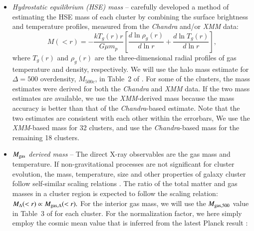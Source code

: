 \documentclass[iop, apj]{emulateapj}
\newcommand{\?}{\stackrel{?}{=}}
\begin{document}
 \begin{itemize}
  \item {\it Hydrostatic equilibrium (HSE) mass} --
	\citet{Martinoetal:14} carefully developed a method of
	estimating the HSE mass of each cluster by combining the surface
	brightness and temperature profiles, measured from the {\it Chandra}
	and/or {\it XMM} data:
\begin{equation}
 M(<r)=-\frac{kT_{g}(r)r}{G\mu m_p}\left[
\frac{d \ln\rho_g(r)}{d \ln r}+\frac{d\ln T_g(r)}{d\ln r}
							     \right],
 \label{eq:hse}
\end{equation}
	where $T_g(r)$ and $\rho_g(r)$ are the three-dimensional radial
	profiles of gas temperature and density, respectively. We will
	use the halo mass estimate for $\Delta=500$ overdensity,
	$M_{500c}$, in Table~2 of \citet{Martinoetal:14}. For some of
	the clusters, the mass estimates were derived for both the
	{\it Chandra} and {\it XMM} data. If the two mass estimates are available,
	we use the {\it XMM}-derived mass because the mass accuracy is better
	than that of the {\it Chandra}-based estimate. Note that the two
	estimates are consistent with each other within the errorbars,
	We use the {\it XMM}-based mass for 32 clusters, and use the
	{\it Chandra}-based mass for the remaining 18 clusters.
  \item {\it $M_{\rm gas}$ derived mass} -- The direct X-ray observables are
	the gas mass and temperature. If non-gravitational processes are
	not significant for cluster evolution, the mass, temperature,
	size and other properties of galaxy cluster follow self-similar
	scaling relations \citep{Kaiser:86}.  The ratio of the total
	matter and gas masses in a cluster region is expected to follow
	the scaling relation:
	 $M_\Delta(<r) \propto M_{{\rm gas},\Delta}(<r).$
	For the interior gas mass, we will use the $M_{{\rm gas},500}$
	value in Table~3 of \citet{Martinoetal:14} for each cluster. For
	the normalization factor, we here simply employ the cosmic mean
	value that is inferred from the latest Planck result \citep{PlanckCosmo:15}: 

\end{itemize}
\end{document}
